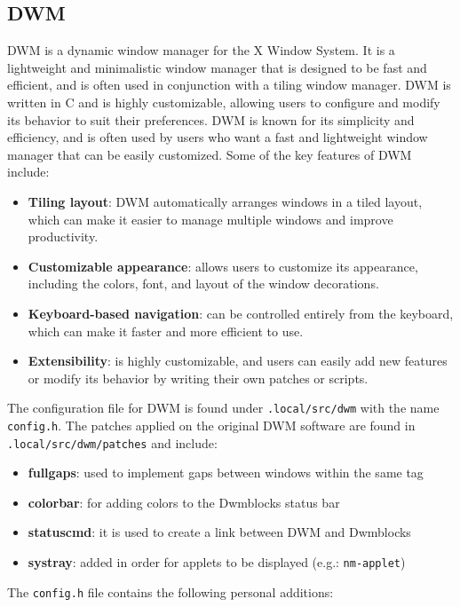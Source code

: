 \documentclass{article}
\begin{document}
\subsection{DWM}

DWM is a dynamic window manager for the X Window System. It is a lightweight and minimalistic window manager that is designed to be fast and efficient, and is often used in conjunction with a tiling window manager. DWM is written in C and is highly customizable, allowing users to configure and modify its behavior to suit their preferences.
\newline
\newline
DWM is known for its simplicity and efficiency, and is often used by users who want a fast and lightweight window manager that can be easily customized. Some of the key features of DWM include:
\begin{itemize}
	\item \textbf{Tiling layout}: DWM automatically arranges windows in a tiled layout, which can make it easier to manage multiple windows and improve productivity.
	\item \textbf{Customizable appearance}: allows users to customize its appearance, including the colors, font, and layout of the window decorations.
	\item \textbf{Keyboard-based navigation}: can be controlled entirely from the keyboard, which can make it faster and more efficient to use.
	\item \textbf{Extensibility}: is highly customizable, and users can easily add new features or modify its behavior by writing their own patches or scripts.
\end{itemize}
The configuration file for DWM is found under \texttt{.local/src/dwm} with the name \texttt{config.h}. The patches applied on the original DWM software are found in \texttt{.local/src/dwm/patches} and include:
\begin{itemize}
	\item \textbf{fullgaps}: used to implement gaps between windows within the same tag
	\item \textbf{colorbar}: for adding colors to the Dwmblocks status bar
	\item \textbf{statuscmd}: it is used to create a link between DWM and Dwmblocks
	\item \textbf{systray}: added in order for applets to be displayed (e.g.: \texttt{nm-applet})
\end{itemize}


\noindent The \texttt{config.h} file contains the following personal additions: 
\newline
\end{document}
